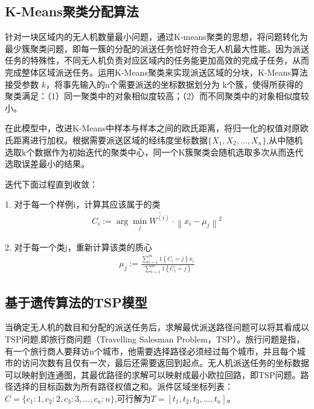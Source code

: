 \documentclass[10.5pt,twocolumn]{jbuaa}
\begin{document}
	\subsection{K-Means聚类分配算法}

	针对一块区域内的无人机数量最小问题，通过K-means聚类的思想，将问题转化为最少簇聚类问题，即每一簇的分配的派送任务恰好符合无人机最大性能。因为派送任务的特殊性，不同无人机负责对应区域内的任务能更加高效的完成子任务，从而完成整体区域派送任务。运用K-Means聚类来实现派送区域的分块，K-Means算法接受参数 $k$，将事先输入的n个需要派送的坐标数据划分为 k个簇，使得所获得的聚类满足：（1）同一聚类中的对象相似度较高；（2）而不同聚类中的对象相似度较小。

	在此模型中，改进K-Means中样本与样本之间的欧氏距离，将归一化的权值对原欧氏距离进行加权。根据需要派送区域的经纬度坐标数据$\{X_{1},X_{2},...,X_{n}\}$,从中随机选取k个数据作为初始迭代的聚类中心，同一个K簇聚类会随机选取多次从而迭代选取误差最小的结果。

	迭代下面过程直到收敛：

	1. 对于每一个样例i，计算其应该属于的类
	\begin{eqnarray}
		C_{i}:=\arg \min _{j}\overline {W^{\left( i\right) }}\cdot \left\| x_{i}-\mu _{j}\right\| ^{2}
	\end{eqnarray}

	2. 对于每一个类j，重新计算该类的质心
	\begin{eqnarray}
		\mu _{j}:=\frac {\sum ^{m}_{i=1}1\left\{ C_{i}=j\right\} x_{i}}{\sum ^{m}_{i=1}1\left\{ C_{i}=j\right\} }
	\end{eqnarray}











	\subsection{基于遗传算法的TSP模型}
	当确定无人机的数目和分配的派送任务后，求解最优派送路径问题可以将其看成以TSP问题,即旅行商问题（Travelling Salesman Problem，TSP）。旅行问题是指，有一个旅行商人要拜访n个城市，他需要选择路径必须经过每个城市，并且每个城市的访问次数有且仅有一次，最后还需要返回到起点。无人机派送任务的坐标数据可以映射到连通图，其最优路径的求解可以映射成最小欧拉回路，即TSP问题。路径选择的目标函数为所有路径权值之和。派件区域坐标列表：$C = \{c_{1}:1,c_{2}:2,c_{3}:3,...,c_{n}:n\}$,可行解为$T = [t_{1},t_{2},t_{3},...,t_{n}]$。
\end{document}
